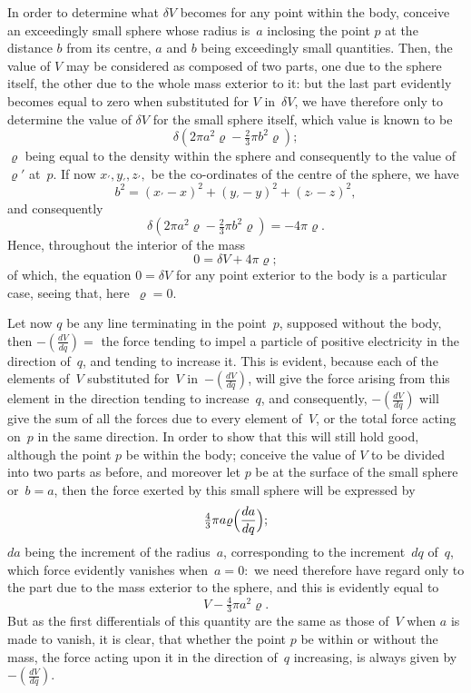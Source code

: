\documentclass[12pt,notitlepage]{amsart}
\renewcommand{\rho}{\varrho}
\begin{document}
In order to determine what $\delta V$ becomes for any point within the body,
conceive an exceedingly small sphere whose radius is~$a$ inclosing the point $p$
at the distance $b$ from its centre,
$a$ and $b$ being exceedingly small quantities.
Then, the value of $V$ may be considered as composed of two parts, one due
to the sphere itself, the other due to the whole mass exterior to it: but the
last part evidently becomes equal to zero
when substituted for $V$ in~$\delta V$,
we have therefore only to determine the value of $\delta V$
for the small sphere
itself, which value is known to be
\[
\delta(2\pi a^2\rho-\tfrac23\pi b^2\rho);
\]
$\rho$ being equal to the density within the sphere
and consequently to the value
of $\rho'$ at~$p$. If now $x_\prime, y_\prime, z_\prime,$
be the co-ordinates of the centre of the sphere, we have
\[
b^2=(x_\prime-x)^2+(y_\prime-y)^2+(z_\prime-z)^2,
\]
and consequently
\[
\delta(2\pi a^2\rho-\tfrac23\pi b^2\rho)=-4\pi\rho.
\]
Hence, throughout the interior of the mass
\[
0=\delta V+4\pi\rho;
\]
of which, the equation $0=\delta V$
for any point exterior to the body is a particular case,
seeing that, here~$\rho=0$.

Let now $q$ be any line terminating in the point~$p$, supposed without
the body, then $-(\frac{dV}{dq})=$ the force
tending to impel a particle of positive
electricity in the direction of~$q$,
and tending to increase it. This is evident,
because each of the elements of~$V$ substituted
for~$V$ in~$-(\frac{dV}{dq})$, will give
the force arising from this element
in the direction tending to increase~$q$, and
consequently, $-(\frac{dV}{dq})$ will give the sum
of all the forces due to every element of~$V$,
or the total force acting on~$p$ in the same direction. In order
to show that this will still hold good,
although the point $p$ be within the body;
conceive the value of $V$ to be divided into two parts as before, and moreover
let $p$ be at the surface of the small sphere
or~${b=a}$, then the force exerted
by this small sphere will be expressed by
\[
\tfrac43\pi a\rho \Bigl(\frac{da}{dq}\Bigr);
\]
$da$ being the increment of the radius~$a$,
corresponding to the increment~$dq$
of~$q$, which force evidently vanishes when~${a=0}:$
we need therefore have
regard only to the part due to the mass exterior to the sphere, and this is
evidently equal to
\[
V-\tfrac43\pi a^2\rho.
\]
But as the first differentials of this quantity are the same
as those of~$V$ when
$a$ is made to vanish, it is clear,
that whether the point $p$ be within or without
the mass, the force acting upon it
in the direction of~$q$ increasing, is always
given by~$-(\frac{dV}{dq})$.
\end{document}
